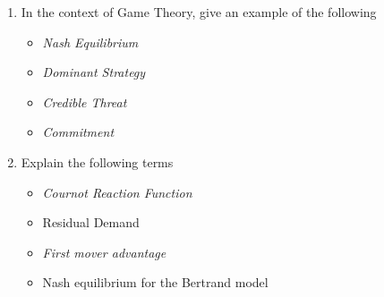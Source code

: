 \documentclass[12pt, a4paper, oneside]{article}\usepackage[]{graphicx}\usepackage[]{color}
\begin{document}
\begin{enumerate}
\item In the context of Game Theory, give an example of the following
\begin{itemize}
\item \emph{Nash Equilibrium}
\item \emph{Dominant Strategy}
\item \emph{Credible Threat}
\item \emph{Commitment}
\end{itemize}


\item Explain the following terms
\begin{itemize}
\item \emph{Cournot Reaction Function}
\item Residual Demand
\item \emph{First mover advantage}
\item Nash equilibrium for the Bertrand model
\end{itemize}

  
  
\end{enumerate}
\end{document}
